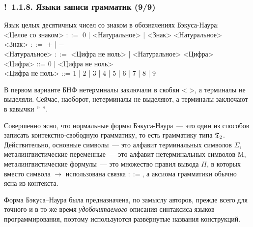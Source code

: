 \documentclass[mathserif,12pt,aspectratio=169]{beamer}
\def\emразделенной{\em разделенной}
\def\em#1{\it\color{blue}#1}
\def\Ok{{\color{green}\textbf{!}\ }}
\begin{document}
\begin{frame}
\frametitle{\Ok 1.1.8. Языки записи грамматик (9/9)}

\vspace{-1pt}
\begin{example}
Язык целых десятичных чисел со знаком в обозначениях Бэкуса-Наура: \\[-2pt]
<Целое со знаком> $::=$ 0 | <Натуральное> | <Знак> <Натуральное> \\[-2pt]
<Знак> $::=$ $+$ | $-$ \\[-2pt]
<Натуральное> $::=$ <Цифра не ноль>  |  <Натуральное> <Цифра> \\[-2pt]
<Цифра> ::= 0 | <Цифра не ноль> \\[-2pt]
<Цифра не ноль> ::=  1 | 2 | 3 | 4 | 5 | 6 | 7 | 8 | 9
\end{example}

\begin{digress}
В первом варианте БНФ нетерминалы заключали в скобки < >, 
а терминалы не выделяли. Сейчас, наоборот,
нетерминалы не выделяют, а терминалы заключают в кавычки $"\ "$.   
\end{digress}

Совершенно ясно, что нормальные формы Бэкуса-Наура~--- это один из
способов записать контекстно-свободную грамматику, 
то есть грамматику типа $\frak{T}_2$.  Действительно, основные
символы~--- это алфавит терминальных символов $\Sigma$,
металингвистические переменные~--- это алфавит нетерминальных
символов $\mathrm{M}$, 
металингвистические формулы~--- это множество правил
вывода $\Pi$, в которых вместо символа $\to$
использована связка $::=$, а аксиома грамматики обычно ясна из контекста.

\begin{digress}
Форма Бэкуса--Наура
была предназначена, по замыслу авторов,
прежде всего
для точного и в то же время
{\em удобочитаемого}
описания синтаксиса
языков программирования,
поэтому используются развёрнутые названия конструкций.
\end{digress}
\end{frame}


\end{document}
